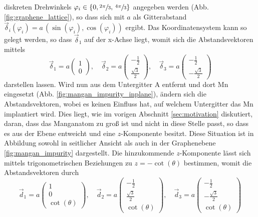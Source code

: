 diskreten Drehwinkels $\varphi_i \in \{ 0,  \sfrac{2\pi}{3}, \, \sfrac{4\pi}{3} \} $ angegeben werden (Abb. \ref{fig:graphene_lattice}), so dass sich mit $a$ als Gitterabstand
$\vec{\delta}_i(\varphi_i) = a \, ( \sin (\varphi_i), \cos (\varphi_i) )$
ergibt.
Das Koordinatensystem kann so gelegt werden, so dass $\vec{\delta}_1$ auf der x-Achse liegt, womit sich die Abstandsvektoren mittels
\begin{equation*}
    \vec{\delta}_1 = a \begin{pmatrix} 1            \\[4pt] 0                   \end{pmatrix}, \quad
    \vec{\delta}_2 = a \begin{pmatrix} -\frac{1}{2} \\[4pt] \frac{\sqrt{3}}{2}  \end{pmatrix}, \quad 
    \vec{\delta}_3 = a \begin{pmatrix} -\frac{1}{2} \\[4pt] -\frac{\sqrt{3}}{2} \end{pmatrix}
\end{equation*}
darstellen lassen.
Wird nun aus dem Untergitter A entfernt und dort Mn eingesetzt (Abb. \ref{fig:mangan_impurity_inplane}), 
ändern sich die Abstandsvektoren, wobei es keinen Einfluss hat, auf welchem Untergitter das Mn implantiert wird.
Dies liegt, wie im vorigen Abschnitt \ref{sec:motivation} diskutiert, daran, dass das Manganatom zu groß ist und nicht in diese Stelle passt, so dass es aus der Ebene entweicht und 
eine $z$-Komponente besitzt.
Diese Situation ist in Abbildung sowohl in seitlicher Ansicht als auch in der Graphenebene  \ref{fig:mangan_impurity} dargestellt.
Die hinzukommende $z$-Komponente lässt sich mittels trigonometrischen Beziehungen zu $z = -\cot (\theta)$ bestimmen, womit die 
Abstandsvektoren durch 
\begin{equation*}
    \vec{d}_1 = a \begin{pmatrix} 1            \\[4pt] 0                   \\[4pt] \cot (\theta)\end{pmatrix}, \quad
    \vec{d}_2 = a \begin{pmatrix} -\frac{1}{2} \\[4pt] \frac{\sqrt{3}}{2}  \\[4pt] \cot (\theta)\end{pmatrix}, \quad 
    \vec{d}_3 = a \begin{pmatrix} -\frac{1}{2} \\[4pt] -\frac{\sqrt{3}}{2} \\[4pt] \cot (\theta)\end{pmatrix}
\end{equation*}
